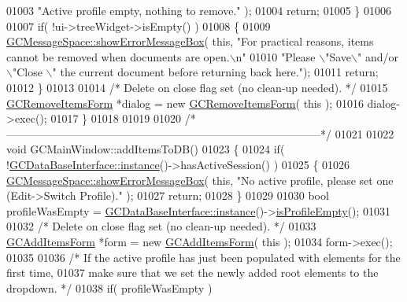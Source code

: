 \begin{DoxyCode}
{{{{{{01003                           \textcolor{stringliteral}{"Active profile empty, nothing to remove."} );
01004     \textcolor{keywordflow}{return};
01005   \}
01006 
01007   \textcolor{keywordflow}{if}( !ui->treeWidget->isEmpty() )
01008   \{
01009     \hyperlink{namespace_g_c_message_space_ab118b3a133686167617eb955029fd44e}{GCMessageSpace::showErrorMessageBox}( \textcolor{keyword}{this}, \textcolor{stringliteral}{"For practical reasons, items
       cannot be removed when documents are open.\(\backslash\)n"}
01010                                                \textcolor{stringliteral}{"Please \(\backslash\)"Save\(\backslash\)" and/or \(\backslash\)"Close
      \(\backslash\)" the current document before returning back here."});
01011     \textcolor{keywordflow}{return};
01012   \}
01013 
01014   \textcolor{comment}{/* Delete on close flag set (no clean-up needed). */}
01015   \hyperlink{class_g_c_remove_items_form}{GCRemoveItemsForm} *dialog = \textcolor{keyword}{new} \hyperlink{class_g_c_remove_items_form}{GCRemoveItemsForm}( \textcolor{keyword}{this} );
01016   dialog->exec();
01017 \}
01018 
01019 
01020 \textcolor{comment}{/*
      --------------------------------------------------------------------------------------*/}
01021 
01022 \textcolor{keywordtype}{void} GCMainWindow::addItemsToDB()
01023 \{
01024   \textcolor{keywordflow}{if}( !\hyperlink{class_g_c_data_base_interface_a1baea9c0667aa8b610ec30076fcab84c}{GCDataBaseInterface::instance}()->hasActiveSession() )
01025   \{
01026     \hyperlink{namespace_g_c_message_space_ab118b3a133686167617eb955029fd44e}{GCMessageSpace::showErrorMessageBox}( \textcolor{keyword}{this}, \textcolor{stringliteral}{"No active profile, please set
       one (Edit->Switch Profile)."} );
01027     \textcolor{keywordflow}{return};
01028   \}
01029 
01030   \textcolor{keywordtype}{bool} profileWasEmpty = \hyperlink{class_g_c_data_base_interface_a1baea9c0667aa8b610ec30076fcab84c}{GCDataBaseInterface::instance}()->\hyperlink{class_g_c_data_base_interface_ae570c403f1b6b7f85e6a5c46829f42a8}{isProfileEmpty}();
01031 
01032   \textcolor{comment}{/* Delete on close flag set (no clean-up needed). */}
01033   \hyperlink{class_g_c_add_items_form}{GCAddItemsForm} *form = \textcolor{keyword}{new} \hyperlink{class_g_c_add_items_form}{GCAddItemsForm}( \textcolor{keyword}{this} );
01034   form->exec();
01035 
01036   \textcolor{comment}{/* If the active profile has just been populated with elements for the first
       time,}
01037 \textcolor{comment}{    make sure that we set the newly added root elements to the dropdown. */}
01038   \textcolor{keywordflow}{if}( profileWasEmpty )
}}}}}}
\end{DoxyCode}
